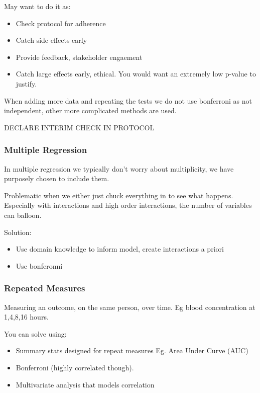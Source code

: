 \documentclass[
  letterpaper,
  DIV=11,
  numbers=noendperiod]{scrreprt}
\providecommand{\tightlist}{%
  \setlength{\itemsep}{0pt}\setlength{\parskip}{0pt}}\usepackage{longtable,booktabs,array}
\begin{document}
May want to do it as:

\begin{itemize}
\tightlist
\item
  Check protocol for adherence
\item
  Catch side effects early
\item
  Provide feedback, stakeholder engaement
\item
  Catch large effects early, ethical. You would want an extremely low
  p-value to justify.
\end{itemize}

When adding more data and repeating the tests we do not use bonferroni
as not independent, other more complicated methods are used.

DECLARE INTERIM CHECK IN PROTOCOL

\hypertarget{multiple-regression}{%
\subsubsection{Multiple Regression}\label{multiple-regression}}

In multiple regression we typically don't worry about multiplicity, we
have purposely chosen to include them.

Problematic when we either just chuck everything in to see what happens.
Especially with interactions and high order interactions, the number of
variables can balloon.

Solution:

\begin{itemize}
\tightlist
\item
  Use domain knowledge to inform model, create interactions a priori
\item
  Use bonferonni
\end{itemize}

\hypertarget{repeated-measures}{%
\subsubsection{Repeated Measures}\label{repeated-measures}}

Measuring an outcome, on the same person, over time. Eg blood
concentration at 1,4,8,16 hours.

You can solve using:

\begin{itemize}
\tightlist
\item
  Summary stats designed for repeat measures Eg. Area Under Curve (AUC)
\item
  Bonferroni (highly correlated though).
\item
  Multivariate analysis that models correlation
\end{itemize}
\end{document}
